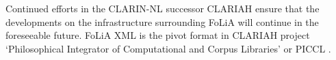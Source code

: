 \documentclass[a4paper,11pt]{article}
\begin{document}
Continued efforts in the CLARIN-NL successor CLARIAH ensure that the
developments on the infrastructure surrounding FoLiA will continue in the
foreseeable future. FoLiA XML is the pivot format in CLARIAH project
`Philosophical Integrator of Computational and Corpus Libraries' or PICCL
\cite{Reynaert2015}.



%
  
\end{document}
